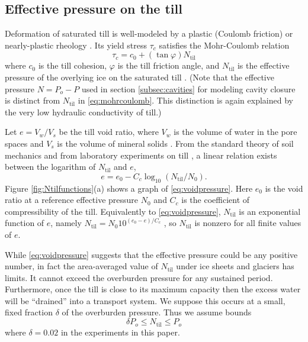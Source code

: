 \documentclass[gmd]{copernicus}   %
\newcommand{\text}{\textrm}
\newcommand{\Ntil}{N_{\text{til}}}
\begin{document}
\subsection{Effective pressure on the till} \label{subsec:effectivepressuretill}  Deformation of saturated till is well-modeled by a plastic (Coulomb friction) or nearly-plastic rheology \citep{Hookeetal1997,TrufferHarrisonEchelmeyer2000,Tulaczyketal2000,SchoofTill}.  Its yield stress $\tau_c$ satisfies the Mohr-Coulomb relation
\begin{equation}
\tau_c = c_0 + (\tan \varphi) \Ntil  \label{eq:mohrcoulomb}
\end{equation}
where $c_0$ is the till cohesion, $\varphi$ is the till friction angle, and $\Ntil$ is the effective pressure of the overlying ice on the saturated till \citep{CuffeyPaterson}.  (Note that the effective pressure $N=P_o-P$ used in section \ref{subsec:cavities} for modeling cavity closure is distinct from $\Ntil$ in \eqref{eq:mohrcoulomb}.  This distinction is again explained by the very low hydraulic conductivity of till.)

Let $e = V_w / V_s$ be the till void ratio, where $V_w$ is the volume of water in the pore spaces and $V_s$ is the volume of mineral solids \citep{Tulaczyketal2000}.  From the standard theory of soil mechanics and from laboratory experiments on till \citep{Hookeetal1997,Tulaczyketal2000}, a linear relation exists between the logarithm of $\Ntil$ and $e$,
\begin{equation}
e = e_0 - C_c \log_{10}\left(\Ntil / N_0\right).  \label{eq:voidpressure}
\end{equation}
Figure \ref{fig:Ntilfunctions}(a) shows a graph of \eqref{eq:voidpressure}.  Here $e_0$ is the void ratio at a reference effective pressure $N_0$ and $C_c$ is the coefficient of compressibility of the till.  Equivalently to \eqref{eq:voidpressure}, $\Ntil$ is an exponential function of $e$, namely $\Ntil = N_0 10^{(e_0 - e)/C_c}$ \citep[equation (15)]{vanderWeletal2013}, so $\Ntil$ is nonzero for all finite values of $e$.

While \eqref{eq:voidpressure} suggests that the effective pressure could be any positive number, in fact the area-averaged value of $\Ntil$ under ice sheets and glaciers has limits.  It cannot exceed the overburden pressure for any sustained period.  Furthermore, once the till is close to its maximum capacity then the excess water will be ``drained'' into a transport system.  We suppose this occurs at a small, fixed fraction $\delta$ of the overburden pressure.  Thus we assume bounds
\begin{equation}
\delta P_o \le \Ntil \le P_o  \label{eq:Ntilbounds}
\end{equation}
where $\delta = 0.02$ in the experiments in this paper.
\end{document}
